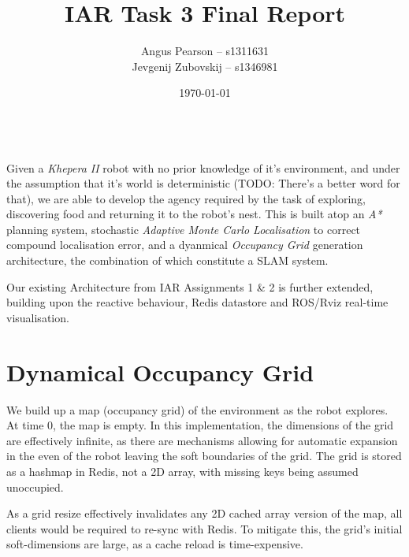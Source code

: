 \documentclass[11pt, a4paper]{article}
\renewenvironment{abstract}{%
{\mdseries\scshape\Large\abstractname}
\vspace{1em}\\
}{\par\noindent}
\begin{document}
\title{IAR Task 3 Final Report}
\author{Angus Pearson -- s1311631\\ Jevgenij Zubovskij -- s1346981}
\date{\today}
\maketitle



\begin{abstract}
Given a \textit{Khepera II} robot with no prior knowledge of it's environment, and under the 
assumption that it's world is deterministic (TODO: There's a better word for that), we are able 
to develop the agency required by the task of exploring, discovering food and returning it to the 
robot's nest. This is built atop an \textit{A*} planning system, stochastic \textit{Adaptive Monte Carlo 
Localisation}\cite{principlesrobot} to correct compound localisation error, and a dyanmical 
\textit{Occupancy Grid} generation architecture, the combination of which constitute a SLAM system.

Our existing Architecture from IAR Assignments 1\cite{task1_report} \& 2\cite{task2_report} is further
extended, building upon the reactive behaviour, Redis datastore and ROS/Rviz real-time 
visualisation.

\end{abstract}




\section{Dynamical Occupancy Grid}

We build up a map (occupancy grid) of the environment as the robot explores. At time 0, the map
is empty. In this implementation, the dimensions of the grid are effectively infinite, as there are
mechanisms allowing for automatic expansion in the even of the robot leaving the soft boundaries of
the grid. The grid is stored as a hashmap in Redis, not a 2D array, with missing keys being assumed 
unoccupied.

As a grid resize effectively invalidates any 2D cached array version of the map, all clients 
would be required to re-sync with Redis. To mitigate this, the grid's initial soft-dimensions
are large, as a cache reload is time-expensive.
\end{document}
